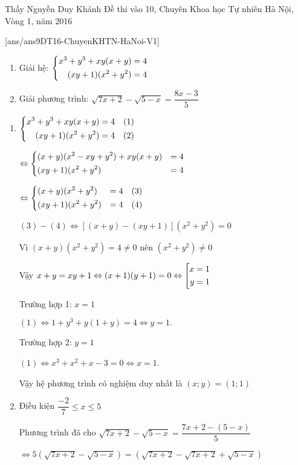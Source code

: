 \begin{name}
{Thầy  Nguyễn Duy Khánh}
{Đề thi vào 10, Chuyên Khoa học Tự nhiên Hà Nội, Vòng 1, năm 2016}
\end{name}
\setcounter{ex}{0}
[ans/ans9DT16-ChuyenKHTN-HaNoi-V1]
\begin{ex}%
    \hfill
    \begin{enumerate}
        \item Giải hệ: $\left\{\begin{aligned}x^3+y^3+xy(x+y) = 4\\(xy+1)(x^2+y^2) = 4\end{aligned}\right.$
        \item Giải phương trình: $\sqrt{7x+2}-\sqrt{5-x} = \dfrac{8x-3}{5}$
    \end{enumerate}
\loigiai
    {
    \begin{enumerate}
        \item $\left\{\begin{aligned}x^3+y^3+xy(x+y) = 4\quad (1)\\(xy+1)(x^2+y^2) = 4\quad (2)\end{aligned}\right.$
        
        $\Leftrightarrow \left\{\begin{aligned}&(x+y)(x^2-xy+y^2)+xy(x+y)& = 4\\ &(xy+1)(x^2+y^2)& = 4\end{aligned}\right.$
        
        $\Leftrightarrow \left\{\begin{aligned}&(x+y)(x^2+y^2) &= 4\quad (3) \\ &(xy+1)(x^2+y^2)& = 4 \quad (4)\end{aligned}\right.$
        
        $(3)-(4) \Leftrightarrow [(x+y)-(xy+1)](x^2+y^2) = 0$
        
        Vì $(x+y)(x^2+y^2) = 4\ne 0$ nên $(x^2+y^2) \ne 0$
        
        Vậy $x+y = xy+1 \Leftrightarrow (x+1)(y+1) = 0 \Leftrightarrow \left[\begin{aligned}x = 1\\ y = 1\end{aligned}\right.$
        
        Trường hợp 1: $x = 1$
        
        $(1) \Leftrightarrow 1+y^3+y(1+y) = 4 \Leftrightarrow y = 1.$
        
        Trường hợp 2: $y = 1$
        
        $(1) \Leftrightarrow  x^3+x^2+x-3 = 0 \Leftrightarrow x = 1$.
        
        Vậy hệ phương trình có nghiệm duy nhất là $(x;y) = (1;1)$
        \item Điều kiện $\dfrac{-2}{7}\leq x \leq 5$
        
        Phương trình đã cho $\sqrt{7x+2}-\sqrt{5-x}=\dfrac{7x+2-(5-x)}{5}$
        
        $\Leftrightarrow 5(\sqrt{7x+2}-\sqrt{5-x}) = (\sqrt{7x+2}-\sqrt{7x+2}+\sqrt{5-x})$
        

\end{enumerate}}
\end{ex}
